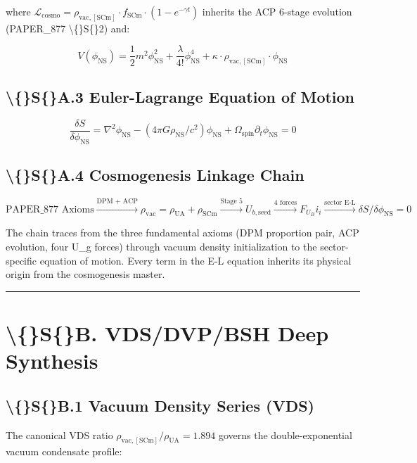 \documentclass[11pt]{article}
\begin{document}
where $\mathcal{L}_{\mathrm{cosmo}} = \rho_{\mathrm{vac,[SCm]}} \cdot f_{\mathrm{SCm}} \cdot (1 - e^{-\gamma t})$ inherits the ACP 6-stage evolution (PAPER\_877 \textbackslash\{\}S\{\}2) and:

$$V(\phi_{\mathrm{NS}}) = \frac{1}{2} m^2 \phi_{\mathrm{NS}}^2 + \frac{\lambda}{4!} \phi_{\mathrm{NS}}^4 + \kappa \cdot \rho_{\mathrm{vac,[SCm]}} \cdot \phi_{\mathrm{NS}}$$

\subsection*{\textbackslash\{\}S\{\}A.3 Euler-Lagrange Equation of Motion}

$$\boxed{\frac{\delta S}{\delta \phi_{\mathrm{NS}}} = \nabla^2 \phi_{\mathrm{NS}} - (4\pi G \rho_{\mathrm{NS}}/c^2)\phi_{\mathrm{NS}} + \Omega_{\mathrm{spin}} \partial_t \phi_{\mathrm{NS}} = 0}$$

\subsection*{\textbackslash\{\}S\{\}A.4 Cosmogenesis Linkage Chain}

$$\text{PAPER\_877 Axioms} \xrightarrow{\text{DPM + ACP}} \rho_{\mathrm{vac}} = \rho_{\mathrm{UA}} + \rho_{\mathrm{SCm}} \xrightarrow{\text{Stage 5}} U_{b,\mathrm{seed}} \xrightarrow{\text{4 forces}} F_U_Bi_i \xrightarrow{\text{sector E-L}} \delta S/\delta \phi_{\mathrm{NS}} = 0$$

The chain traces from the three fundamental axioms (DPM proportion pair, ACP evolution, four U\_g forces) through vacuum density initialization to the sector-specific equation of motion. Every term in the E-L equation inherits its physical origin from the cosmogenesis master.

\noindent\rule{\textwidth}{0.4pt}

\section*{\textbackslash\{\}S\{\}B. VDS/DVP/BSH Deep Synthesis}

\subsection*{\textbackslash\{\}S\{\}B.1 Vacuum Density Series (VDS)}

The canonical VDS ratio $\rho_{\mathrm{vac,[SCm]}} / \rho_{\mathrm{UA}} = 1.894$ governs the double-exponential vacuum condensate profile:
\end{document}
